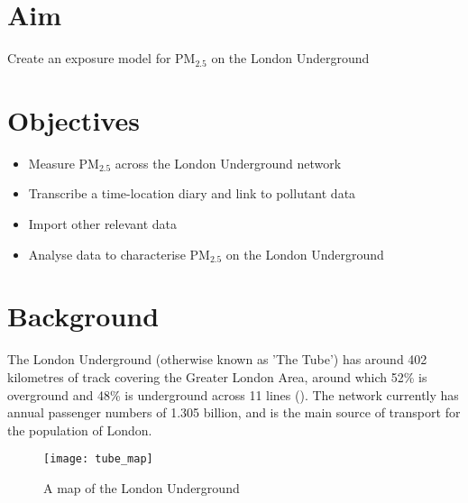 \section{Aim}
\label{sec:3aim}

Create an exposure model for PM$_{2.5}$ on the London Underground

\section{Objectives}
\label{sec:3objectives}

\begin{itemize}
\item Measure PM$_{2.5}$ across the London Underground network
\item Transcribe a time-location diary and link to pollutant data
\item Import other relevant data
\item Analyse data to characterise PM$_{2.5}$ on the London Underground
\end{itemize}

\section{Background}
\label{sec:3background}

The London Underground (otherwise known as 'The Tube') has around 402 kilometres of track covering the Greater London Area, around which 52\% is overground and 48\% is underground across 11 lines  (\cite{TransportforLondon2014a}). The network currently has annual passenger numbers of 1.305 billion, and is the main source of transport for the population of London. 

\begin{figure}[H]
\centering
\texttt{[image: tube\_map]}
\caption{A map of the London Underground}
\label{fig:tube_map}
\end{figure}

